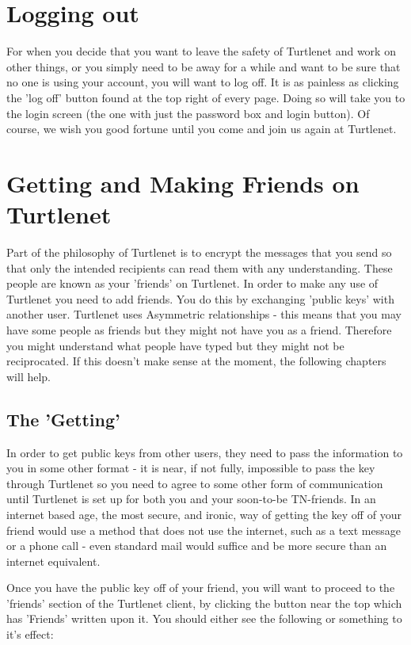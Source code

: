 \section{Logging out}
For when you decide that you want to leave the safety of Turtlenet and work on
other things, or you simply need to be away for a while and want to be sure that
no one is using your account, you will want to log off.  It is as painless as
clicking the 'log off' button found at the top right of every page.  Doing so
will take you to the login screen (the one with just the password box and login
button).  Of course, we wish you good fortune until you come and join us again
at Turtlenet.

\section{Getting and Making Friends on Turtlenet}
Part of the philosophy of Turtlenet is to encrypt the messages that you send so
that only the intended recipients can read them with any understanding.  These
people are known as your 'friends' on Turtlenet.  In order to make any use of
Turtlenet you need to add friends.  You do this by exchanging 'public keys' with
another user.  Turtlenet uses Asymmetric relationships - this means that you may
have some people as friends but they might not have you as a friend.  Therefore
you might understand what people have typed but they might not be reciprocated.
If this doesn't make sense at the moment, the following chapters will help.

\subsection{The 'Getting'}
In order to get public keys from other users, they need to pass the information
to you in some other format - it is near, if not fully, impossible to pass the
key through Turtlenet so you need to agree to some other form of communication
until Turtlenet is set up for both you and your soon-to-be TN-friends.  In an
internet based age, the most secure, and ironic, way of getting the key off of
your friend would use a method that does not use the internet, such as a text
message or a phone call - even standard mail would suffice and be more secure
than an internet equivalent.

Once you have the public key off of your friend, you will want to proceed to the
'friends' section of the Turtlenet client, by clicking the button near the top
which has 'Friends' written upon it.  You should either see the following or
something to it's effect:

